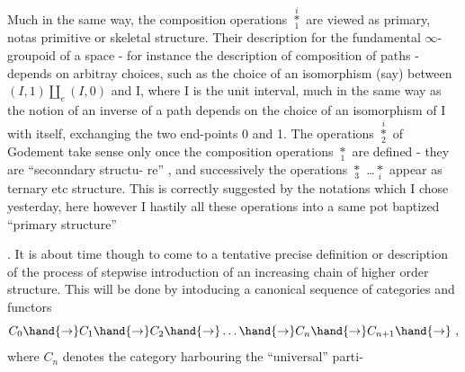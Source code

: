 Much in the same way, the composition operations $\overset{i}{\underset{1}{*}}$ are viewed as
primary, notas primitive or skeletal structure. Their description for
the fundamental $\infty$-groupoid of a space - for instance the description of
composition of paths - depends on arbitray choices, such as the choice of
an isomorphism (say) between $(I,1)\amalg_{e}(I,0)$ and I, where I is the unit
interval, much in the same way as the notion of an inverse of a path
depends on the choice of an isomorphism of I with itself, exchanging the
two end-points 0 and 1. The operations $\overset{i}{\underset{2}{*}}$ of Godement take sense only once
the composition operations $\underset{1}{*}$ are defined - they are ``seconndary structu-%
re'' , and successively the operations $\underset{3}{*}$ \ldots $\underset{i}{*}$ appear as ternary etc
structure. This is correctly suggested by the notations which I chose
yesterday, here however I hastily  all these operations into a same
pot baptized ``primary structure''\hand{!}

. It is about time though to come to a tentative precise definition or
description of the process of stepwise introduction of an increasing chain
of higher order structure. This will be done by intoducing a canonical
sequence of categories and functors
\[ C_{0} \hand{\to} C_{1} \hand{\to} C_{2} \hand{\to} \ldots \hand{\to} C_{n} \hand{\to} C_{n+1} \hand{\to} \ , \]
where $C_{n}$ denotes the  category harbouring the ``universal'' parti-%

